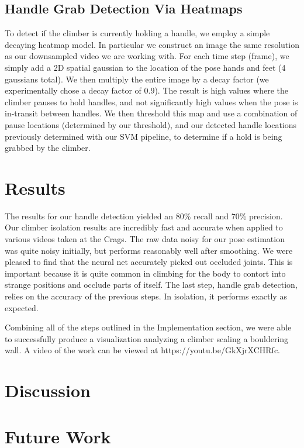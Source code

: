 \documentclass{chi2009}
\begin{document}
\subsection{Handle Grab Detection Via Heatmaps}

To detect if the climber is currently holding a handle, we employ a simple decaying heatmap model. In particular we construct an image the same resolution as our downsampled video we are working with. For each time step (frame), we simply add a 2D spatial gaussian to the location of the pose hands and feet (4 gaussians total). We then multiply the entire image by a decay factor (we experimentally chose a decay factor of 0.9). The result is high values where the climber pauses to hold handles, and not significantly high values when the pose is in-transit between handles. We then threshold this map and use a combination of pause locations (determined by our threshold), and our detected handle locations previously determined with our SVM pipeline, to determine if a hold is being grabbed by the climber.

\section{Results}
The results for our handle detection yielded an 80\% recall and 70\% precision. Our climber isolation results are incredibly fast and accurate when applied to various videos taken at the Crags. The raw data noisy for our pose estimation was quite noisy initially, but performs reasonably well after smoothing. We were pleased to find that the neural net accurately picked out occluded joints. This is important because it is quite common in climbing for the body to contort into strange positions and occlude parts of itself. The last step, handle grab detection, relies on the accuracy of the previous steps. In isolation, it performs exactly as expected. 

Combining all of the steps outlined in the Implementation section, we were able to successfully produce a visualization analyzing a climber scaling a bouldering wall. A video of the work can be viewed at https://youtu.be/GkXjrXCHRfc.

\section{Discussion}


\section{Future Work}
\end{document}
